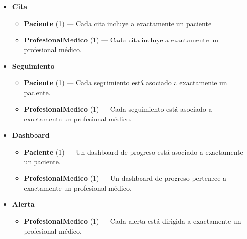 \documentclass{article}
\begin{document}
\begin{itemize}
	\item \textbf{Cita}
	\begin{itemize}
		\item \textbf{Paciente} (1) — Cada cita incluye a exactamente un paciente.
		\item \textbf{ProfesionalMedico} (1) — Cada cita incluye a exactamente un profesional médico.
	\end{itemize}
	
	\item \textbf{Seguimiento}
	\begin{itemize}
		\item \textbf{Paciente} (1) — Cada seguimiento está asociado a exactamente un paciente.
		\item \textbf{ProfesionalMedico} (1) — Cada seguimiento está asociado a exactamente un profesional médico.
	\end{itemize}
	
	\item \textbf{Dashboard}
	\begin{itemize}
		\item \textbf{Paciente} (1) — Un dashboard de progreso está asociado a exactamente un paciente.
		\item \textbf{ProfesionalMedico} (1) — Un dashboard de progreso pertenece a exactamente un profesional médico.
	\end{itemize}
	
	\item \textbf{Alerta}
	\begin{itemize}
		\item \textbf{ProfesionalMedico} (1) — Cada alerta está dirigida a exactamente un profesional médico.
	\end{itemize}
\end{itemize}
\end{document}
